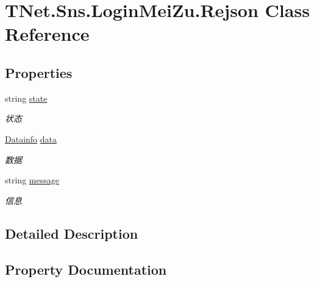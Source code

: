 \hypertarget{class_t_net_1_1_sns_1_1_login_mei_zu_1_1_rejson}{}\section{T\+Net.\+Sns.\+Login\+Mei\+Zu.\+Rejson Class Reference}
\label{class_t_net_1_1_sns_1_1_login_mei_zu_1_1_rejson}


 


\subsection*{Properties}
\begin{DoxyCompactItemize}
\item 
string \mbox{\hyperlink{class_t_net_1_1_sns_1_1_login_mei_zu_1_1_rejson_a2bc5c0b3df5477d5a2943b0dbd055568}{state}}
\begin{DoxyCompactList}\small\item\em 状态 \end{DoxyCompactList}\item 
\mbox{\hyperlink{class_t_net_1_1_sns_1_1_login_mei_zu_1_1_datainfo}{Datainfo}} \mbox{\hyperlink{class_t_net_1_1_sns_1_1_login_mei_zu_1_1_rejson_a6fc5e981809700ef8f674b95b2890005}{data}}
\begin{DoxyCompactList}\small\item\em 数据 \end{DoxyCompactList}\item 
string \mbox{\hyperlink{class_t_net_1_1_sns_1_1_login_mei_zu_1_1_rejson_a7688d6c374a7270e90d9485bd8e65a53}{message}}
\begin{DoxyCompactList}\small\item\em 信息 \end{DoxyCompactList}\end{DoxyCompactItemize}


\subsection{Detailed Description}




\subsection{Property Documentation}
\mbox{\label{class_t_net_1_1_sns_1_1_login_mei_zu_1_1_rejson_a6fc5e981809700ef8f674b95b2890005}} 
